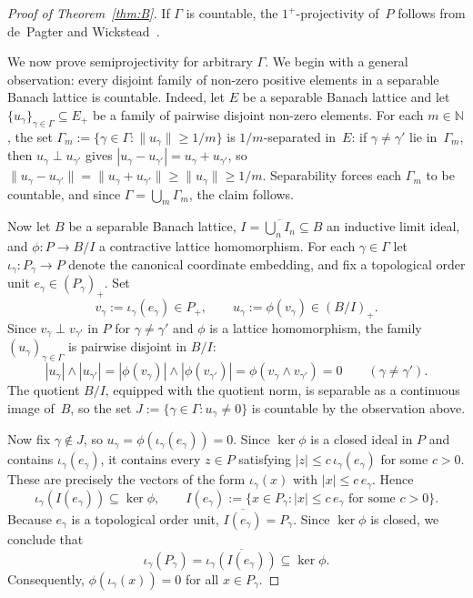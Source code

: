 \documentclass[11pt]{amsart}
\renewcommand{\le}{\leqslant}
\renewcommand{\ge}{\geqslant}
\numberwithin{equation}{section}
\theoremstyle{definition}
\theoremstyle{remark}
\theoremstyle{plain}
\begin{document}
\begin{proof}[Proof of Theorem~\ref{thm:B}]
If $\Gamma$ is countable, the $1^+$-projectivity of~$P$ follows from
de~Pagter and Wickstead~\cite[Theorem~11.8]{dpw}.

We now prove semiprojectivity for arbitrary $\Gamma$.
We begin with a general observation: every disjoint family of non-zero positive
elements in a separable Banach lattice is countable.
Indeed, let $E$ be a separable Banach lattice and let
$\{u_\gamma\}_{\gamma\in\Gamma}\subseteq E_+$
be a family of pairwise disjoint non-zero elements.
For each $m\in\mathbb N$, the set $\Gamma_m:=\{\gamma\in\Gamma: \|u_\gamma\|\ge 1/m\}$
is $1/m$-separated in~$E$:
if $\gamma\ne \gamma'$ lie in~$\Gamma_m$, then $u_\gamma\perp u_{\gamma'}$ gives
$|u_\gamma-u_{\gamma'}|=u_\gamma+u_{\gamma'}$, so
$\|u_\gamma-u_{\gamma'}\|=\|u_\gamma+u_{\gamma'}\|\ge \|u_\gamma\|\ge 1/m$.
Separability forces each $\Gamma_m$ to be countable,
and since $\Gamma=\bigcup_{m}\Gamma_m$, the claim follows.

Now let $B$ be a separable Banach lattice,
$I=\overline{\bigcup_n I_n}\subseteq B$ an inductive limit ideal,
and $\phi\colon P\to B/I$ a contractive lattice homomorphism.
For each $\gamma\in\Gamma$ let $\iota_\gamma\colon P_\gamma\to P$ denote the canonical coordinate
embedding, and fix a topological order unit $e_\gamma\in (P_\gamma)_+$.
Set
\[
v_\gamma:=\iota_\gamma(e_\gamma)\in P_+,
\qquad
u_\gamma:=\phi(v_\gamma)\in (B/I)_+.
\]
Since $v_\gamma\perp v_{\gamma'}$ in $P$ for $\gamma\neq\gamma'$ and $\phi$ is a lattice
homomorphism, the family $(u_\gamma)_{\gamma\in\Gamma}$ is pairwise disjoint in $B/I$:
\[
|u_\gamma|\wedge |u_{\gamma'}|
=|\phi(v_\gamma)|\wedge |\phi(v_{\gamma'})|
=\phi(v_\gamma\wedge v_{\gamma'})=0
\qquad(\gamma\neq\gamma').
\]
The quotient $B/I$, equipped with the quotient norm, is separable as a continuous image of~$B$,
so the set $J:=\{\gamma\in\Gamma: u_\gamma\ne 0\}$ is countable
by the observation above.

Now fix $\gamma\notin J$, so $u_\gamma=\phi(\iota_\gamma(e_\gamma))=0$.
Since $\ker\phi$ is a closed ideal in $P$ and contains $\iota_\gamma(e_\gamma)$,
it contains every $z\in P$ satisfying $|z|\le c\,\iota_\gamma(e_\gamma)$ for some $c>0$.
These are precisely the vectors of the form $\iota_\gamma(x)$ with
$|x|\le c\,e_\gamma$.
Hence
\[
\iota_\gamma(I(e_\gamma))\subseteq \ker\phi,
\qquad
I(e_\gamma):=\{x\in P_\gamma: |x|\le c\,e_\gamma \text{ for some } c>0\}.
\]
Because $e_\gamma$ is a topological order unit, $\overline{I(e_\gamma)}=P_\gamma$.
Since $\ker\phi$ is closed, we conclude that
\[
\iota_\gamma(P_\gamma)=\overline{\iota_\gamma(I(e_\gamma))}\subseteq \ker\phi.
\]
Consequently, $\phi(\iota_\gamma(x))=0$ for all $x\in P_\gamma$.


\end{proof}
\end{document}
